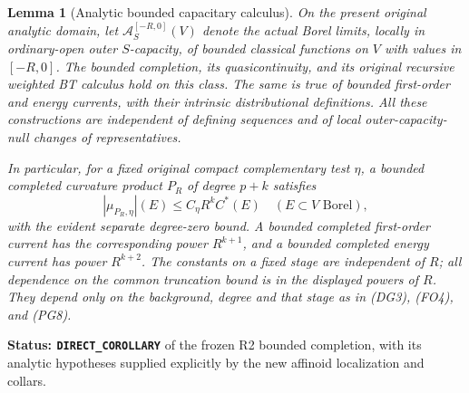 \documentclass[11pt,a4paper]{article}
\numberwithin{equation}{section}
\newtheorem{lemma}[theorem]{Lemma}
\theoremstyle{definition}
\theoremstyle{remark}
\begin{document}
\begin{lemma}[Analytic bounded capacitary calculus]
\label{lem:r11-analytic-bounded-completion}
On the present original analytic domain, let
$\mathcal A_S^{[-R,0]}(V)$ denote the actual Borel limits,
locally in ordinary-open outer $S$-capacity, of bounded
classical functions on $V$ with values in $[-R,0]$.
The bounded completion, its quasicontinuity, and its original
recursive weighted BT calculus hold on this class.
The same is true of bounded first-order and energy currents,
with their intrinsic distributional definitions.
All these constructions are independent of defining sequences
and of local outer-capacity-null changes of representatives.

In particular, for a fixed original compact complementary test
$\eta$, a bounded completed curvature product $P_R$ of degree
$p+k$ satisfies
\[
                 |\mu_{P_R,\eta}|(E)
                        \leq C_\eta R^k C^*(E)
                    \quad(E\subset V\text{ Borel}),
 \tag{RC1}
\]
with the evident separate degree-zero bound. A bounded completed
first-order current has the corresponding power $R^{k+1}$,
and a bounded completed energy current has power $R^{k+2}$.
The constants on a fixed stage are independent of $R$; all dependence
on the common truncation bound is in the displayed powers of $R$.
They depend only on the background, degree and that stage as in
(DG3), (FO4), and (PG8).
\end{lemma}

\noindent\textbf{Status: \texttt{DIRECT\_COROLLARY}} of
the frozen R2 bounded completion, with its analytic hypotheses
supplied explicitly by the new affinoid localization and collars.
\end{document}
